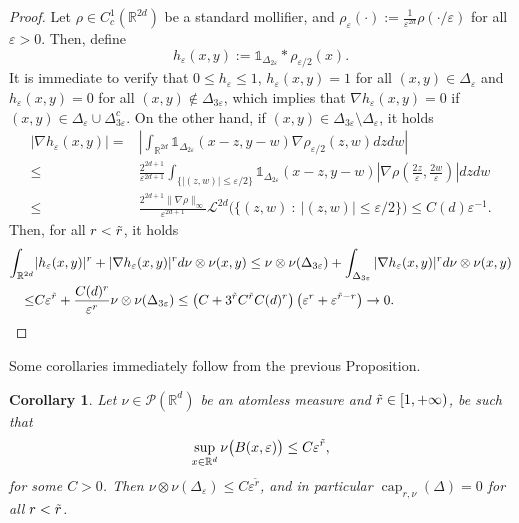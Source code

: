 \documentclass[10pt,leqno]{amsart}
\numberwithin{equation}{section}
\newtheorem{co}[teorema]{Corollary}
\newcommand{\R}{\mathbb{R}}
\newcommand{\PP}{\mathcal{P}}
\begin{document}
\begin{proof}
    Let $\rho\in C_c^1(\R^{2d})$ be a standard mollifier, and $\rho_\varepsilon(\cdot):= \frac{1}{\varepsilon^{2d}}\rho(\cdot/\varepsilon)$ for all $\varepsilon>0$. Then, define 
    \[h_\varepsilon(x,y):= \mathds{1}_{\Delta_{2\varepsilon}}* \rho_{\varepsilon/2}(x).\]
    It is immediate to verify that $0\leq h_\varepsilon \leq 1$, $h_\varepsilon(x,y) = 1$ for all $(x,y) \in \Delta_{\varepsilon}$ and $h_\varepsilon(x,y) = 0$ for all $(x,y)\notin \Delta_{3\varepsilon}$, which implies that $\nabla h_\varepsilon(x,y) = 0$ if $(x,y)\in \Delta_\varepsilon\cup \Delta_{3\varepsilon}^c$. On the other hand, if $(x,y) \in \Delta_{3\varepsilon}\setminus \Delta_\varepsilon$, it holds
    \begin{align*}
        |\nabla h_\varepsilon(x,y)| = & \left| \int_{\R^{2d}} \mathds{1}_{\Delta_{2\varepsilon}}(x-z,y-w) \nabla \rho_{\varepsilon/2}(z,w) dz dw \right|
        \\
        \leq & \frac{2^{2d+1}}{\varepsilon^{2d+1}}\int_{\{|(z,w)|\leq \varepsilon/2\}}\mathds{1}_{\Delta_{2\varepsilon}}(x-z,y-w) \left|\nabla\rho \left( \frac{2z}{\varepsilon},\frac{2w}{\varepsilon} \right) \right| dzdw
        \\
        \leq &
        \frac{2^{2d+1}\|\nabla\rho\|_\infty}{\varepsilon^{2d+1}} \mathcal{L}^{2d}\big( \{(z,w) \ : \ |(z,w)|\leq \varepsilon/2\} \big) \leq C(d)\varepsilon^{-1}.
    \end{align*}
    Then, for all $r<\Tilde{r}$, it holds
    \begin{align*}
        \int_{\R^{2d}} & |h_\varepsilon(x,y)|^r + |\nabla h_\varepsilon(x,y)|^r d\nu\otimes \nu(x,y) \leq \nu\otimes \nu(\Delta_{3\varepsilon}) + \int_{\Delta_{3\varepsilon}} |\nabla h_\varepsilon(x,y)|^r d\nu\otimes\nu(x,y)
        \\
        \leq & 
        C\varepsilon^{\Tilde{r}} + \frac{C(d)^r}{\varepsilon^r} \nu\otimes \nu(\Delta_{3\varepsilon}) 
        \leq \big(C + 3^{\Tilde{r}}C^{\Tilde{r}}C(d)^r\big) \left(\varepsilon^r + \varepsilon^{\Tilde{r}-r}\right) \to 0.
        \qedhere
    \end{align*}
\end{proof}

\noindent Some corollaries immediately follow from the previous Proposition.

\begin{co}
    Let $\nu\in \PP(\R^d)$ be an atomless measure and $\Tilde{r}\in [1,+\infty)$, be such that 
    \begin{equation}\label{eq: small ball rate}
        \sup_{x\in \R^d} \nu\big( B(x,\varepsilon) \big) \leq C \varepsilon^{\Tilde{r}},
    \end{equation}
    for some $C>0$. Then $\nu\otimes \nu(\Delta_\varepsilon) \leq C\varepsilon^{\tilde{r}}$, and in particular $\operatorname{cap}_{r,\nu}(\Delta) = 0$ for all $r<\Tilde{r}$.
\end{co}
\end{document}
